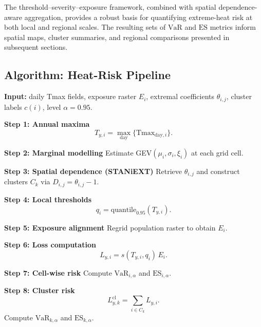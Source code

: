 \documentclass[12pt]{article}
\newcommand{\VaR}{\mathrm{VaR}}
\newcommand{\ES}{\mathrm{ES}}
\begin{document}
The threshold–severity–exposure framework, combined with spatial dependence-aware
aggregation, provides a robust basis for quantifying extreme-heat risk at both local and
regional scales. The resulting sets of \(\VaR\) and \(\ES\) metrics inform spatial maps,
cluster summaries, and regional comparisons presented in subsequent sections.

































\subsection{Algorithm: Heat-Risk Pipeline}

\begin{tcolorbox}[
    enhanced, breakable,
    colback=white,
    colframe=black,
    title=\textbf{Algorithm 1: Heat-Risk Pipeline},
    fonttitle=\bfseries,
    left=2mm, right=2mm, top=2mm, bottom=2mm, boxrule=0.7pt]

\begin{algorithmic}[1]

\State \textbf{Input:} daily Tmax fields, exposure raster $E_i$, extremal coefficients $\theta_{i,j}$, cluster labels $c(i)$, level $\alpha=0.95$.

\State \textbf{Step 1: Annual maxima}
\[
T_{y,i} = \max_{\text{day}} \{\mathrm{Tmax}_{\text{day},i}\}.
\]

\State \textbf{Step 2: Marginal modelling}
Estimate GEV$(\mu_i,\sigma_i,\xi_i)$ at each grid cell.

\State \textbf{Step 3: Spatial dependence (STANiEXT)}
Retrieve $\theta_{i,j}$ and construct clusters $C_k$ via $D_{i,j} = \theta_{i,j}-1$.

\State \textbf{Step 4: Local thresholds}
\[
q_i = \mathrm{quantile}_{0.95}(T_{y,i}).
\]

\State \textbf{Step 5: Exposure alignment}
Regrid population raster to obtain $E_i$.

\State \textbf{Step 6: Loss computation}
\[
L_{y,i} = s(T_{y,i},q_i)\,E_i.
\]

\State \textbf{Step 7: Cell-wise risk}
Compute $\VaR_{i,\alpha}$ and $\ES_{i,\alpha}$.

\State \textbf{Step 8: Cluster risk}
\[
L^{\mathrm{cl}}_{y,k} = \sum_{i \in C_k} L_{y,i}.
\]
Compute $\VaR_{k,\alpha}$ and $\ES_{k,\alpha}$.

\end{algorithmic}
\end{tcolorbox}
\end{document}
